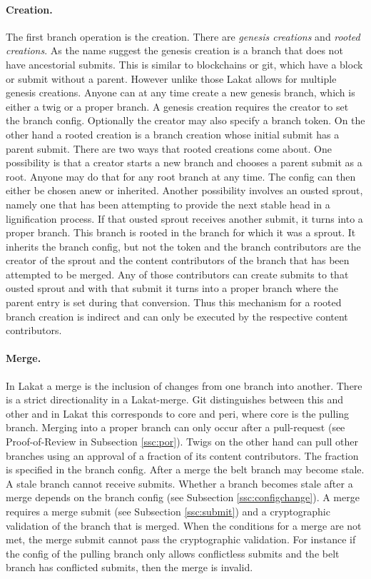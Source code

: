 \documentclass[14pt]{article}
\begin{document}
\paragraph{Creation.} The first branch operation is the creation. There are \textit{genesis creations} and \textit{rooted creations}. As the name suggest the genesis creation is a branch that does not have ancestorial submits. This is similar to blockchains or git, which have a block or submit without a parent. However unlike those Lakat allows for multiple genesis creations. Anyone can at any time create a new genesis branch, which is either a twig or a proper branch. A genesis creation requires the creator to set the branch config. Optionally the creator may also specify a branch token. 
On the other hand a rooted creation is a branch creation whose initial submit has a parent submit. There are two ways that rooted creations come about. One possibility is that a creator starts a new branch and chooses a parent submit as a root. Anyone may do that for any root branch at any time. The config can then either be chosen anew or inherited. Another possibility involves an ousted sprout, namely one that has been attempting to provide the next stable head in a lignification process. If that ousted sprout receives another submit, it turns into a proper branch. This branch is rooted in the branch for which it was a sprout. It inherits the branch config, but not the token and the branch contributors are the creator of the sprout and the content contributors of the branch that has been attempted to be merged. Any of those contributors can create submits to that ousted sprout and with that submit it turns into a proper branch where the parent entry is set during that conversion. Thus this mechanism for a rooted branch creation is indirect and can only be executed by the respective content contributors.

\paragraph{Merge.} In Lakat a merge is the inclusion of changes from one branch into another. There is a strict directionality in a Lakat-merge. Git distinguishes between this and other and in Lakat this corresponds to core and peri, where core is the pulling branch. Merging into a proper branch can only occur after a pull-request (see Proof-of-Review in Subsection \ref{ssc:por}). Twigs on the other hand can pull other branches using an approval of a fraction of its content contributors. The fraction is specified in the branch config. After a merge the belt branch may become stale. A stale branch cannot receive submits. Whether a branch becomes stale after a merge depends on the branch config (see Subsection \ref{ssc:configchange}).
A merge requires a merge submit (see Subsection \ref{ssc:submit}) and a cryptographic validation of the branch that is merged. When the conditions for a merge are not met, the merge submit cannot pass the cryptographic validation. For instance if the config of the pulling branch only allows conflictless submits and the belt branch has conflicted submits, then the merge is invalid.
\end{document}
